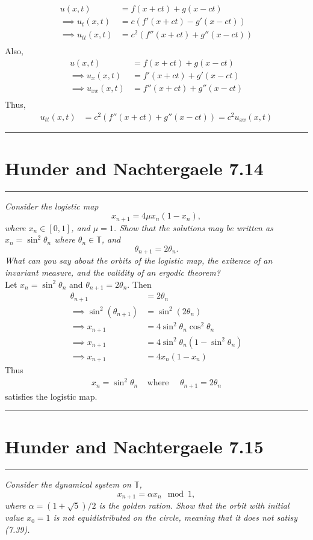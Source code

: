 \documentclass{article} %
\theoremstyle{plain}
\newcommand{\problem}[1]{
\begin{minipage}{\textwidth}
    \begin{center}
        \noindent\rule{5cm}{1pt}
    \end{center}
    \section{\bf #1}
    \begin{center}
        \noindent\rule{5cm}{1pt}
    \end{center}
    \vspace{0.25cm}
\end{minipage}
}
\numberwithin{equation}{section} %
\numberwithin{figure}{section} %
\numberwithin{table}{section} %
\begin{document}
\begin{align*}
    u(x,t) &= f(x + ct) + g(x - ct) \\
    \implies u_t(x,t) &= c (f'(x + ct) - g'(x - ct)) \\
    \implies u_{tt}(x,t) &= c^2 (f''(x + ct) + g''(x - ct)) \\
\end{align*}
Also,
\begin{align*}
    u(x,t) &= f(x + ct) + g(x - ct) \\
    \implies u_x(x,t) &= f'(x + ct) + g'(x - ct) \\
    \implies u_{xx}(x,t) &= f''(x + ct) + g''(x - ct) \\
\end{align*}
Thus,
\begin{align*}
    u_{tt}(x,t) &= c^2 (f''(x + ct) + g''(x - ct)) = c^2 u_{xx}(x,t)
\end{align*}

\problem{Hunder and Nachtergaele 7.14}
\emph{Consider the logistic map $$x_{n+1} = 4\mu x_n(1 - x_n),$$ where $x_n \in [0,1]$, and $\mu = 1$.  Show that the solutions may be written as $x_n = \sin^2\theta_n$ where $\theta_n \in \mathbb{T}$, and $$\theta_{n+1} = 2\theta_n.$$  What can you say about the orbits of the logistic map, the exitence of an invariant measure, and the validity of an ergodic theorem?} \\

Let $x_n = \sin^2 \theta_n$ and $\theta_{n+1} = 2\theta_n$.  Then
\begin{align*}
    \theta_{n+1} &= 2\theta_n \\
    \implies \sin^2(\theta_{n+1}) &= \sin^2(2\theta_n) \\
    \implies x_{n+1} &= 4\sin^2\theta_n\cos^2\theta_n \\
    \implies x_{n+1} &= 4\sin^2\theta_n(1 - \sin^2\theta_n) \\
    \implies x_{n+1} &= 4x_n(1 - x_n)
\end{align*}
Thus
\begin{align*}
    x_n = \sin^2 \theta_n\ \ \ \ \ \text{where}\ \ \ \ \ \ \theta_{n+1} = 2\theta_n
\end{align*}
satisfies the logistic map.

\problem{Hunder and Nachtergaele 7.15}
\emph{Consider the dynamical system on $\mathbb{T}$, $$x_{n+1} = \alpha x_n \mod 1,$$ where $\alpha = (1 + \sqrt{5})/2$ is the golden ration.  Show that the orbit with initial value $x_0 = 1$ is not equidistributed on the circle, meaning that it does not satisy (7.39).}
\end{document}
